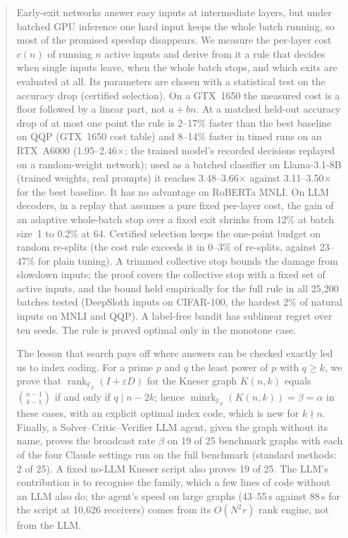 \documentclass[11pt,a4paper]{article}
\theoremstyle{plain}
\newcommand{\x}{\ensuremath{\times}}
\newcommand{\Fp}{\mathbb{F}_p}
\begin{document}
\begin{abstract}
\noindent
Early-exit networks answer easy inputs at intermediate layers, but under batched GPU inference one hard input keeps
the whole batch running, so most of the promised speedup disappears. We measure the per-layer cost $c(n)$ of running
$n$ active inputs and derive from it a rule that decides when single inputs leave, when the whole batch stops, and
which exits are evaluated at all. Its parameters are chosen with a statistical test on the accuracy drop
(certified selection). On a GTX~1650 the measured cost is a floor followed by a linear part, not $a+bn$. At a matched
held-out accuracy drop of at most one point the rule is 2--17\% faster than the best baseline on QQP (GTX~1650 cost
table) and 8--14\% faster in timed runs on an RTX~A6000 (1.95--2.46\x; the trained model's recorded decisions
replayed on a random-weight network); used as a batched classifier on Llama-3.1-8B (trained weights, real prompts)
it reaches 3.48--3.66\x{} against 3.11--3.50\x{} for the best baseline. It has no advantage on RoBERTa MNLI. On LLM
decoders, in a replay that assumes a pure fixed per-layer cost, the gain of an adaptive whole-batch stop over a
fixed exit shrinks from 12\% at batch size~1 to 0.2\% at 64. Certified selection keeps the one-point budget on
random re-splits (the cost rule exceeds it in 0--3\% of re-splits, against 23--47\% for plain tuning). A trimmed
collective stop bounds the damage from slowdown inputs; the proof covers the collective stop with a fixed set of
active inputs, and the bound held empirically for the full rule in all 25{,}200 batches tested (DeepSloth inputs on
CIFAR-100, the hardest 2\% of natural inputs on MNLI and QQP). A label-free bandit has sublinear regret over ten
seeds. The rule is proved optimal only in the monotone case.

The lesson that search pays off where answers can be checked exactly led us to index coding. For a prime $p$ and
$q$ the least power of $p$ with $q\ge k$, we prove that $\operatorname{rank}_{\Fp}(I+\varepsilon D)$ for the Kneser
graph $K(n,k)$ equals $\binom{n-1}{k-1}$ if and only if $q \mid n-2k$; hence
$\operatorname{minrk}_{\Fp}(K(n,k))=\beta=\alpha$ in these cases, with an explicit optimal index code, which is new
for $k\nmid n$. Finally, a Solver--Critic--Verifier LLM agent, given the graph without its name, proves the
broadcast rate $\beta$ on 19 of 25 benchmark graphs with each of the four Claude settings run on the full benchmark
(standard methods: 2 of 25). A fixed no-LLM Kneser script also proves 19 of 25. The LLM's contribution is to
recognise the family, which a few lines of code without an LLM also do; the agent's speed on large graphs (43--55\,s
against 88\,s for the script at 10{,}626 receivers) comes from its $O(N^2r)$ rank engine, not from the LLM.
\end{abstract}

\tableofcontents
\clearpage






\end{document}
